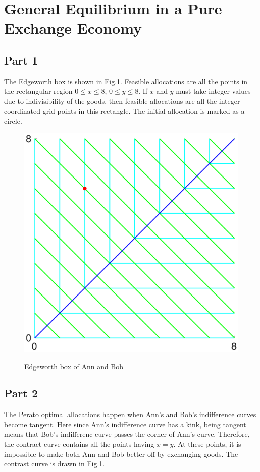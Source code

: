 \documentclass{article}
\begin{document}
\section{General Equilibrium in a Pure Exchange Economy}
\subsection{Part 1}
The Edgeworth box is shown in Fig.\ref{Edgeworth}. Feasible allocations are all the points in the rectangular region $0\leqslant x\leqslant8$, $0\leqslant y\leqslant8$. If $x$ and $y$ must take integer values due to indivisibility of the goods, then feasible allocations are all the integer-coordinated grid points in this rectangle. The initial allocation is marked as a circle.
\begin{figure}[!htbp]
	\centering
	\includegraphics[width=12cm]{figure3.eps}\\
	\caption{Edgeworth box of Ann and Bob}
	\label{Edgeworth}
\end{figure}


\subsection{Part 2}
The Perato optimal allocations happen when Ann's and Bob's indifference curves become tangent. Here since Ann's indifference curve has a kink, being tangent means that Bob's indifferenc curve passes the corner of Ann's curve. Therefore, the contract curve contains all the points having $x=y$. At these points, it is impossible to make both Ann and Bob better off by exchanging goods. The contrast curve is drawn in Fig.\ref{Edgeworth}.
\end{document}

